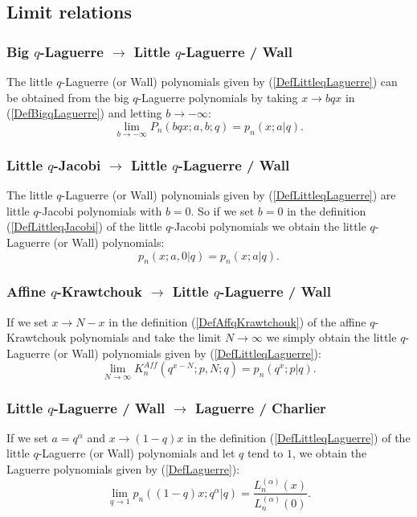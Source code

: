 \documentclass[envcountchap,graybox]{svmono}
\newcounter{rom}
\begin{document}
\subsection*{Limit relations}

\subsubsection*{Big $q$-Laguerre $\rightarrow$ Little $q$-Laguerre / Wall}
The little $q$-Laguerre (or Wall) polynomials given by (\ref{DefLittleqLaguerre})
can be obtained from the big $q$-Laguerre polynomials by taking $x\rightarrow bqx$
in (\ref{DefBigqLaguerre}) and letting $b\rightarrow -\infty$:
$$\lim_{b\rightarrow -\infty}P_n(bqx;a,b;q)=p_n(x;a|q).$$

\subsubsection*{Little $q$-Jacobi $\rightarrow$ Little $q$-Laguerre / Wall}
The little $q$-Laguerre (or Wall) polynomials given by (\ref{DefLittleqLaguerre})
are little $q$-Jacobi polynomials with $b=0$. So if we set $b=0$ in the
definition (\ref{DefLittleqJacobi}) of the little $q$-Jacobi polynomials we
obtain the little $q$-Laguerre (or Wall) polynomials:
$$p_n(x;a,0|q)=p_n(x;a|q).$$

\subsubsection*{Affine $q$-Krawtchouk $\rightarrow$ Little $q$-Laguerre / Wall}
If we set $x\rightarrow N-x$ in the definition (\ref{DefAffqKrawtchouk})
of the affine $q$-Krawtchouk polynomials and take the limit
$N\rightarrow\infty$ we simply obtain the little $q$-Laguerre (or Wall)
polynomials given by (\ref{DefLittleqLaguerre}):
$$\lim_{N\rightarrow\infty}K_n^{Aff}(q^{x-N};p,N;q)=p_n(q^x;p|q).$$

\subsubsection*{Little $q$-Laguerre / Wall $\rightarrow$ Laguerre / Charlier}
If we set $a=q^{\alpha}$ and $x\rightarrow (1-q)x$ in the definition (\ref{DefLittleqLaguerre})
of the little $q$-Laguerre (or Wall) polynomials and let $q$ tend to $1$, we obtain
the Laguerre polynomials given by (\ref{DefLaguerre}):
\begin{equation}
\lim_{q\rightarrow 1}p_n((1-q)x;q^{\alpha}|q)=\frac{L_n^{(\alpha)}(x)}{L_n^{(\alpha)}(0)}.
\end{equation}
\end{document}

